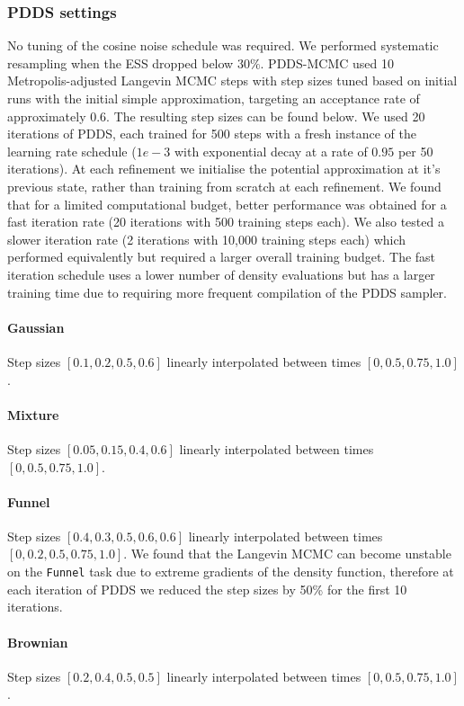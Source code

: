 \documentclass{article}
\theoremstyle{plain}
\theoremstyle{definition}
\theoremstyle{remark}
\begin{document}
\subsubsection{PDDS settings}
No tuning of the cosine noise schedule was required. We performed systematic resampling \cite{douc2005comparison} when the ESS dropped below $30\%$. PDDS-MCMC used 10 Metropolis-adjusted Langevin MCMC steps with step sizes tuned based on initial runs with the initial simple approximation, targeting an acceptance rate of approximately 0.6. The resulting step sizes can be found below. We used 20 iterations of PDDS, each trained for 500 steps with a fresh instance of the learning rate schedule ($1e-3$ with exponential decay at a rate of $0.95$ per 50 iterations). At each refinement we initialise the potential approximation at it's previous state, rather than training from scratch at each refinement. We found that for a limited computational budget, better performance was obtained for a fast iteration rate (20 iterations with 500 training steps each). We also tested a slower iteration rate (2 iterations with 10,000 training steps each) which performed equivalently but required a larger overall training budget. The fast iteration schedule uses a lower number of density evaluations but has a larger training time due to requiring more frequent compilation of the PDDS sampler.

\paragraph{Gaussian} Step sizes $[0.1, 0.2, 0.5, 0.6]$ linearly interpolated between times $[0, 0.5, 0.75, 1.0]$.
\paragraph{Mixture} Step sizes $[0.05, 0.15, 0.4, 0.6]$ linearly interpolated between times $[0, 0.5, 0.75, 1.0]$.
\paragraph{Funnel} Step sizes $[0.4, 0.3, 0.5, 0.6, 0.6] $ linearly interpolated between times $[0, 0.2, 0.5, 0.75, 1.0]$. We found that the Langevin MCMC can become unstable on the \verb|Funnel| task due to extreme gradients of the density function, therefore at each iteration of PDDS we reduced the step sizes by 50\% for the first 10 iterations.
\paragraph{Brownian} Step sizes $[0.2, 0.4, 0.5, 0.5]$ linearly interpolated between times $[0, 0.5, 0.75, 1.0]$.
\end{document}
